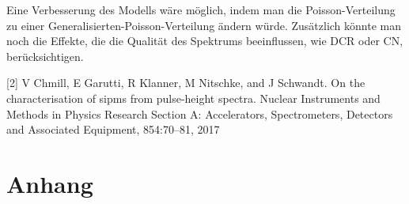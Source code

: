 \documentclass[12pt]{article}
\begin{document}
Eine Verbesserung des Modells wäre möglich, indem man die Poisson-Verteilung zu einer Generalisierten-Poisson-Verteilung ändern würde.
Zusätzlich könnte man noch die Effekte, die die Qualität des Spektrums beeinflussen, wie DCR oder CN, berücksichtigen.

\thispagestyle{empty}





[2] V Chmill, E Garutti, R Klanner, M Nitschke, and J Schwandt.
On the characterisation of sipms from pulse-height spectra.
Nuclear Instruments and Methods in Physics Research Section A: Accelerators, Spectrometers, Detectors and Associated Equipment, 854:70–81, 2017

\clearpage
\appendix
\section{Anhang}\label{sec:anhang}
\end{document}
